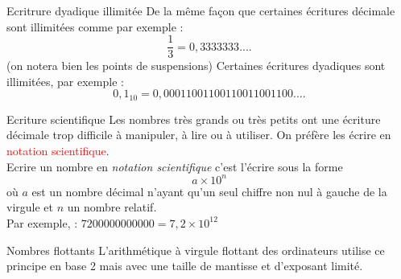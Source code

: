\documentclass[10pt]{beamer}
\begin{document}
\begin{frame}
    \mframe{\NF}
    \begin{alertblock}{Ecritrure dyadique illimitée}
        De la même façon que certaines écritures décimale sont illimitées comme par exemple :
        $$ \frac{1}{3} = 0,3333333.... $$
        (on notera bien les points de suspensions)
        Certaines écritures dyadiques sont illimitées, par exemple :
        $$ 0,1_{10} = 0,00011001100110011001100.... $$
    \end{alertblock}
    
\end{frame}

\begin{frame}
    \mframe{\NF}
    \begin{block}{\textcolor{yellow}{\rappel} Ecriture scientifique}
        Les nombres très grands ou très petits ont une écriture décimale trop difficile à manipuler, à lire ou à utiliser. On préfère les écrire en \textcolor{red}{notation scientifique}. \pause \\
Ecrire un nombre en \textit{notation scientifique} c'est l'écrire sous la forme \pause $$a \times 10^n$$ \pause où $a$ est un nombre décimal n'ayant qu'un seul chiffre non nul à gauche de la virgule et $n$ un nombre  relatif. \\
  Par exemple, \pause : $7200000000000 = 7,2 \times 10^{12}$
    \end{block}
    \begin{alertblock}{Nombres flottants}
        L'arithmétique à virgule flottant des ordinateurs utilise ce principe en base 2 mais avec une taille de mantisse et d'exposant limité. 
    \end{alertblock}
\end{frame}
\end{document}
